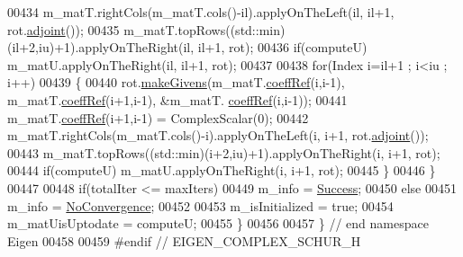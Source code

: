\begin{DoxyCode}
00434     m\_matT.rightCols(m\_matT.cols()-il).applyOnTheLeft(il, il+1, rot.\hyperlink{group___jacobi___module_a89c8ea615f8fa77ddd5810a1e5fde4da}{adjoint}());
00435     m\_matT.topRows((std::min)(il+2,iu)+1).applyOnTheRight(il, il+1, rot);
00436     \textcolor{keywordflow}{if}(computeU) m\_matU.applyOnTheRight(il, il+1, rot);
00437 
00438     \textcolor{keywordflow}{for}(Index i=il+1 ; i<iu ; i++)
00439     \{
00440       rot.\hyperlink{group___jacobi___module_af73c81e9cc139b7e0d877ce553b02ec0}{makeGivens}(m\_matT.\hyperlink{class_eigen_1_1_plain_object_base_a25626a55b26a4323565f79d1b7c48ea8}{coeffRef}(i,i-1), m\_matT.\hyperlink{class_eigen_1_1_plain_object_base_a25626a55b26a4323565f79d1b7c48ea8}{coeffRef}(i+1,i-1), &m\_matT.
      \hyperlink{class_eigen_1_1_plain_object_base_a25626a55b26a4323565f79d1b7c48ea8}{coeffRef}(i,i-1));
00441       m\_matT.\hyperlink{class_eigen_1_1_plain_object_base_a25626a55b26a4323565f79d1b7c48ea8}{coeffRef}(i+1,i-1) = ComplexScalar(0);
00442       m\_matT.rightCols(m\_matT.cols()-i).applyOnTheLeft(i, i+1, rot.\hyperlink{group___jacobi___module_a89c8ea615f8fa77ddd5810a1e5fde4da}{adjoint}());
00443       m\_matT.topRows((std::min)(i+2,iu)+1).applyOnTheRight(i, i+1, rot);
00444       \textcolor{keywordflow}{if}(computeU) m\_matU.applyOnTheRight(i, i+1, rot);
00445     \}
00446   \}
00447 
00448   \textcolor{keywordflow}{if}(totalIter <= maxIters)
00449     m\_info = \hyperlink{group__enums_gga85fad7b87587764e5cf6b513a9e0ee5ea52581b035f4b59c203b8ff999ef5fcea}{Success};
00450   \textcolor{keywordflow}{else}
00451     m\_info = \hyperlink{group__enums_gga85fad7b87587764e5cf6b513a9e0ee5eaba1c8763d1179778070f365ecc4157a8}{NoConvergence};
00452 
00453   m\_isInitialized = \textcolor{keyword}{true};
00454   m\_matUisUptodate = computeU;
00455 \}
00456 
00457 \} \textcolor{comment}{// end namespace Eigen}
00458 
00459 \textcolor{preprocessor}{#endif // EIGEN\_COMPLEX\_SCHUR\_H}
\end{DoxyCode}
